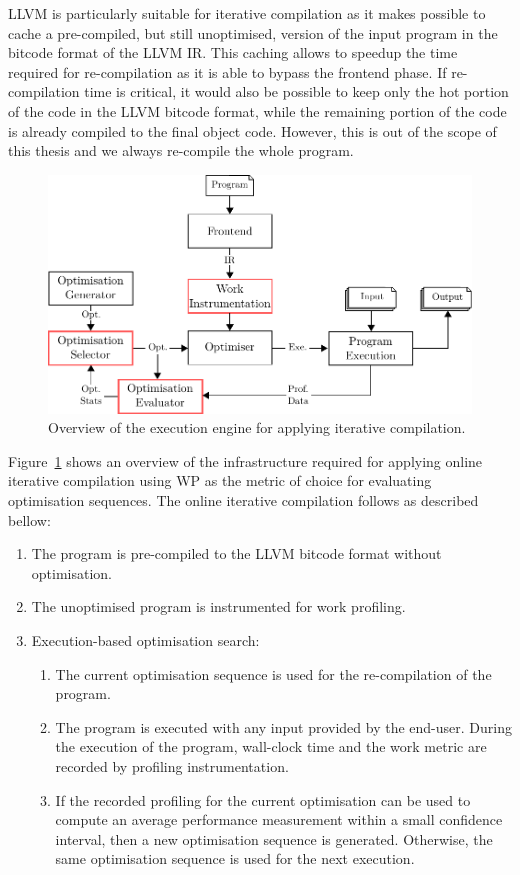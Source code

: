 \documentclass[sigplan,10pt]{acmart}
\theoremstyle{definition}
\newcommand{\itercomp}{{iterative compilation}}
\begin{document}
LLVM is particularly suitable for iterative compilation as it makes possible to cache a pre-compiled, but still unoptimised, version of the input program in the bitcode format of the LLVM IR.  
This caching allows to speedup the time required for re-compilation as it is able to bypass the frontend phase.
If re-compilation time is critical, it would also be possible to keep only the hot portion of the code in the LLVM bitcode format, while the remaining portion of the code is already compiled to the final object code.
However, this is out of the scope of this thesis and we always re-compile the whole program.

\begin{figure}[htb]
    \centering
    \includegraphics[width=\linewidth]{figs/infra-diagram}
    \caption{Overview of the execution engine for applying {\itercomp}.}
    \label{fig:infra-diagram}
\end{figure}

Figure~\ref{fig:infra-diagram} shows an overview of the infrastructure required for applying online {\itercomp}
using WP as the metric of choice for evaluating optimisation sequences.
The online {\itercomp} follows as described bellow:
\begin{enumerate}
\item The program is pre-compiled to the LLVM bitcode format without optimisation.
\item The unoptimised program is instrumented for work profiling.
\item Execution-based optimisation search:
 \begin{enumerate}
   \item The current optimisation sequence is used for the re-compilation of the program.
   \item The program is executed with any input provided by the end-user.
         During the execution of the program, wall-clock time and the work metric are recorded by profiling instrumentation.
   \item If the recorded profiling for the current optimisation can be used to compute an average performance measurement within a small confidence interval,
         then a new optimisation sequence is generated.
         Otherwise, the same optimisation sequence is used for the next execution.
 \end{enumerate}
\end{enumerate}
\end{document}
